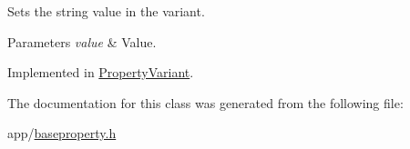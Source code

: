 Sets the string value in the variant. 


\begin{DoxyParams}{Parameters}
{\em value} & Value. \\
\hline
\end{DoxyParams}


Implemented in \hyperlink{class_property_variant_a9930eec4da97a6efca8246a23e016b46}{Property\-Variant}.



The documentation for this class was generated from the following file\-:\begin{DoxyCompactItemize}
\item 
app/\hyperlink{baseproperty_8h}{baseproperty.\-h}\end{DoxyCompactItemize}
